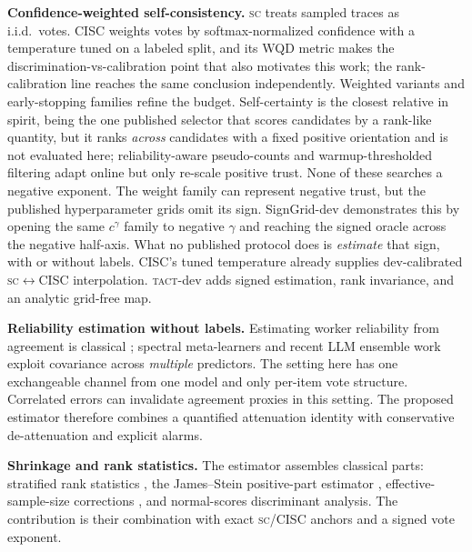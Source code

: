 \documentclass{article}
\newcommand{\SC}{\textsc{sc}}
\newcommand{\TACT}{\textsc{tact}}
\begin{document}
\textbf{Confidence-weighted self-consistency.} \SC{} \citep{wang2023selfconsistency} treats sampled traces as i.i.d.\ votes. CISC \citep{taubenfeld2025cisc} weights votes by softmax-normalized confidence with a temperature tuned on a labeled split, and its WQD metric makes the discrimination-vs-calibration point that also motivates this work; the rank-calibration line \citep{huang2024rankcalibration} reaches the same conclusion independently. Weighted variants \citep{li2023diverse} and early-stopping families
\citep{aggarwal2023adaptive,li2024escape} refine the budget. Self-certainty
\citep{borda2025} is the closest relative in spirit, being the one published
selector that scores candidates by a rank-like quantity, but it ranks \emph{across} candidates with a fixed positive
orientation and is not evaluated here; reliability-aware pseudo-counts \citep{reasc2026} and warmup-thresholded filtering \citep{deepconf2025} adapt online but only re-scale positive trust. None of these searches a negative exponent. The
weight family can represent negative trust, but the published hyperparameter
grids omit its sign. SignGrid-dev demonstrates this by opening the same $c^{\gamma}$ family to
negative $\gamma$ and reaching the signed oracle across the negative half-axis.
What no published protocol does is \emph{estimate} that sign, with or without
labels. CISC's tuned temperature already supplies dev-calibrated
\SC$\leftrightarrow$CISC interpolation. \TACT-dev adds signed estimation, rank
invariance, and an analytic grid-free map.

\textbf{Reliability estimation without labels.} Estimating worker reliability from agreement is classical \citep{dawid1979maximum,whitehill2009whose,karger2011iterative}; spectral meta-learners \citep{parisi2014ranking} and recent LLM ensemble work \citep{fuse2026,beyondmajority2025} exploit covariance across \emph{multiple} predictors. The setting here has one exchangeable channel from one model and only per-item vote structure. Correlated errors can invalidate agreement proxies in this setting. The proposed estimator therefore combines a quantified attenuation identity with conservative de-attenuation and explicit alarms.

\textbf{Shrinkage and rank statistics.} The estimator assembles classical parts: stratified rank statistics \citep{vanelteren1960}, the James--Stein positive-part estimator \citep{james1961estimation}, effective-sample-size corrections \citep{kish1965,rao1981analysis}, and normal-scores discriminant analysis. The contribution is their combination with exact \SC{}/CISC anchors and a signed vote exponent.
\end{document}
